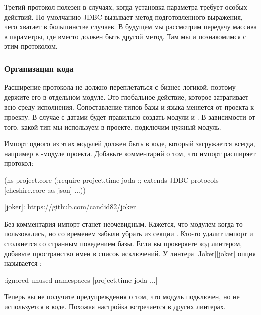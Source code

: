 Третий протокол  полезен в случаях, когда установка параметра требует особых действий. По умолчанию JDBC вызывает метод  подготовленного выражения, чего хватает в большинстве случаев. В будущем мы рассмотрим передачу массива в параметры, где вместо  должен быть другой метод. Там мы и познакомимся с этим протоколом.

\subsubsection{Организация кода}

Расширение протокола не должно переплетаться с бизнес-логикой, поэтому держите его в отдельном модуле. Это глобальное действие, которое затрагивает всю среду исполнения. Сопоставление типов базы и языка меняется от проекта к проекту. В случае с датами будет правильно создать модули  и . В зависимости от того, какой тип мы используем в проекте, подключим нужный модуль.

Импорт одного из этих модулей должен быть в коде, который загружается всегда, например в -модуле проекта. Добавьте комментарий о том, что импорт расширяет протокол:

\begin{english}
  \begin{clojure}
(ns project.core
  (:require
   project.time-joda ;; extends JDBC protocols
   [cheshire.core :as json]
   ...))
  \end{clojure}
\end{english}

[joker]: https://github.com/candid82/joker

Без комментария импорт станет неочевидным. Кажется, что модулем когда-то пользовались, но со временем забыли убрать из секции . Кто-то удалит импорт и столкнется со странным поведением базы. Если вы проверяете код линтером, добавьте пространство имен в список исключений. У линтера [Joker][joker] опция называется :

\begin{english}
  \begin{clojure}
{:ignored-unused-namespaces [project.time-joda
                             ...]}
  \end{clojure}
\end{english}

Теперь вы не получите предупреждения о том, что модуль  подключен, но не используется в коде. Похожая настройка встречается в других линтерах.

